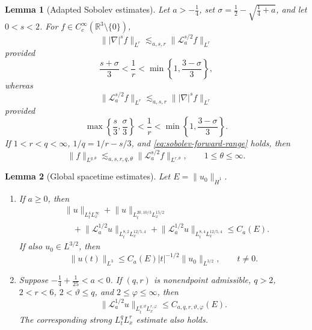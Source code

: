 \documentclass[preprint,12pt]{elsarticle}
\numberwithin{equation}{section}
\newtheorem{lemma}{Lemma}[section]
\theoremstyle{definition}
\theoremstyle{remark}
\newcommand{\R}{\mathbb R}
\newcommand{\cL}{\mathcal L}
\newcommand{\norm}[2]{\lVert #1\rVert_{#2}}
\begin{document}
\begin{lemma}[Adapted Sobolev estimates]
\label{lem:adapted-sobolev}
Let $a>-\frac14$, set
$\sigma=\frac12-\sqrt{\frac14+a}$, and let $0<s<2$. For
$f\in C_c^\infty(\R^3\setminus\{0\})$,
\[
 \norm{|\nabla|^sf}{L^r}
 \lesssim_{a,s,r}\norm{\cL_a^{s/2}f}{L^r}
\]
provided
\begin{equation}
 \frac{s+\sigma}{3}<\frac1r<
 \min\left\{1,\frac{3-\sigma}{3}\right\},
 \label{eq:sobolev-forward-range}
\end{equation}
whereas
\[
 \norm{\cL_a^{s/2}f}{L^r}
 \lesssim_{a,s,r}\norm{|\nabla|^sf}{L^r}
\]
provided
\[
 \max\left\{\frac{s}{3},\frac{\sigma}{3}\right\}<\frac1r<
 \min\left\{1,\frac{3-\sigma}{3}\right\}.
\]
If $1<r<q<\infty$, $1/q=1/r-s/3$, and
\eqref{eq:sobolev-forward-range} holds, then
\begin{equation}
 \norm{f}{L^{q,\theta}}
 \lesssim_{a,s,r,q,\theta}
 \norm{\cL_a^{s/2}f}{L^{r,\theta}},
 \qquad 1\leq\theta\leq\infty.
 \label{eq:adapted-embedding}
\end{equation}
\end{lemma}

\begin{lemma}[Global spacetime estimates]
\label{lem:global-spacetime}
Let $E=\norm{u_0}{\dot H^1}$.
\begin{enumerate}
 \item If $a\geq0$, then
 \begin{equation}
 \begin{split}
  &\norm{u}{L_t^4L_x^\infty}
  +\norm{u}{L_t^{20,10/3}L_x^{15/2}}\\
  &\quad
  +\norm{\cL_a^{1/2}u}{L_t^{8,2}L_x^{12/5,4}}
  +\norm{\cL_a^{1/2}u}{L_t^{8,4}L_x^{12/5,4}}
  \leq C_a(E).
 \end{split}
 \label{eq:nonnegative-spacetime}
 \end{equation}
 If also $u_0\in L^{3/2}$, then
 \[
  \norm{u(t)}{L^3}
  \leq C_a(E)|t|^{-1/2}\norm{u_0}{L^{3/2}},
  \qquad t\neq0.
 \]
 \item Suppose $-\frac14+\frac1{25}<a<0$. If $(q,r)$ is
 nonendpoint admissible, $q>2$, $2<r<6$, $2<\vartheta\leq q$, and
 $2\leq\varphi\leq\infty$, then
 \begin{equation}
  \norm{\cL_a^{1/2}u}{L_t^{q,\vartheta}L_x^{r,\varphi}}
  \leq C_{a,q,r,\vartheta,\varphi}(E).
  \label{eq:attractive-spacetime}
 \end{equation}
 The corresponding strong $L_t^qL_x^r$ estimate also holds.
\end{enumerate}
\end{lemma}
\end{document}
